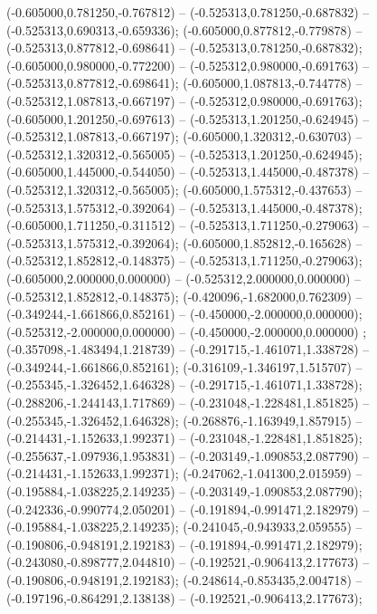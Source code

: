  (-0.605000,0.781250,-0.767812) -- (-0.525313,0.781250,-0.687832) -- (-0.525313,0.690313,-0.659336);
 (-0.605000,0.877812,-0.779878) -- (-0.525313,0.877812,-0.698641) -- (-0.525313,0.781250,-0.687832);
 (-0.605000,0.980000,-0.772200) -- (-0.525312,0.980000,-0.691763) -- (-0.525313,0.877812,-0.698641);
 (-0.605000,1.087813,-0.744778) -- (-0.525312,1.087813,-0.667197) -- (-0.525312,0.980000,-0.691763);
 (-0.605000,1.201250,-0.697613) -- (-0.525313,1.201250,-0.624945) -- (-0.525312,1.087813,-0.667197);
 (-0.605000,1.320312,-0.630703) -- (-0.525312,1.320312,-0.565005) -- (-0.525313,1.201250,-0.624945);
 (-0.605000,1.445000,-0.544050) -- (-0.525313,1.445000,-0.487378) -- (-0.525312,1.320312,-0.565005);
 (-0.605000,1.575312,-0.437653) -- (-0.525313,1.575312,-0.392064) -- (-0.525313,1.445000,-0.487378);
 (-0.605000,1.711250,-0.311512) -- (-0.525313,1.711250,-0.279063) -- (-0.525313,1.575312,-0.392064);
 (-0.605000,1.852812,-0.165628) -- (-0.525312,1.852812,-0.148375) -- (-0.525313,1.711250,-0.279063);
 (-0.605000,2.000000,0.000000) -- (-0.525312,2.000000,0.000000) -- (-0.525312,1.852812,-0.148375);
 (-0.420096,-1.682000,0.762309) -- (-0.349244,-1.661866,0.852161) -- (-0.450000,-2.000000,0.000000);
 (-0.525312,-2.000000,0.000000) -- (-0.450000,-2.000000,0.000000) ;
 (-0.357098,-1.483494,1.218739) -- (-0.291715,-1.461071,1.338728) -- (-0.349244,-1.661866,0.852161);
 (-0.316109,-1.346197,1.515707) -- (-0.255345,-1.326452,1.646328) -- (-0.291715,-1.461071,1.338728);
 (-0.288206,-1.244143,1.717869) -- (-0.231048,-1.228481,1.851825) -- (-0.255345,-1.326452,1.646328);
 (-0.268876,-1.163949,1.857915) -- (-0.214431,-1.152633,1.992371) -- (-0.231048,-1.228481,1.851825);
 (-0.255637,-1.097936,1.953831) -- (-0.203149,-1.090853,2.087790) -- (-0.214431,-1.152633,1.992371);
 (-0.247062,-1.041300,2.015959) -- (-0.195884,-1.038225,2.149235) -- (-0.203149,-1.090853,2.087790);
 (-0.242336,-0.990774,2.050201) -- (-0.191894,-0.991471,2.182979) -- (-0.195884,-1.038225,2.149235);
 (-0.241045,-0.943933,2.059555) -- (-0.190806,-0.948191,2.192183) -- (-0.191894,-0.991471,2.182979);
 (-0.243080,-0.898777,2.044810) -- (-0.192521,-0.906413,2.177673) -- (-0.190806,-0.948191,2.192183);
 (-0.248614,-0.853435,2.004718) -- (-0.197196,-0.864291,2.138138) -- (-0.192521,-0.906413,2.177673);
